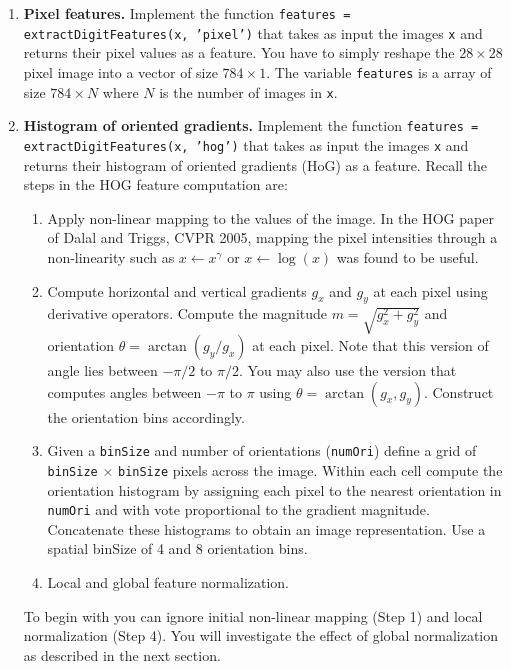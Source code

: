 \documentclass[10pt,letterpaper]{article}
\newcommand{\cmd}[1] {{\color{blue}\texttt{#1}}}
\begin{document}
\begin{enumerate}

\item \textbf{Pixel features.}  Implement the function \cmd{features = extractDigitFeatures(x, 'pixel')} that takes as input the images \cmd{x} and returns their pixel values as a feature. You have to simply reshape the $28\times28$ pixel image into a vector of size $784\times 1$. The variable \cmd{features} is a array of size $784\times N$ where $N$ is the number of images in \cmd{x}. 

\item \textbf{Histogram of oriented gradients.}
Implement the function \cmd{features = extractDigitFeatures(x, 'hog')} that takes as input the images \cmd{x} and returns their histogram of oriented gradients (HoG) as a feature. Recall the steps in the HOG feature computation are:
\begin{enumerate}

\item Apply non-linear mapping to the values of the image. In the HOG paper of Dalal and Triggs, CVPR 2005, mapping the pixel intensities through a non-linearity such as $x \leftarrow x^{\gamma}$ or $x \leftarrow \log(x)$ was found to be useful.

\item Compute horizontal and vertical gradients $g_x$ and $g_y$ at each pixel using derivative operators. Compute the magnitude $m = \sqrt{g_x^2 + g_y^2}$ and orientation $\theta=\arctan(g_y/g_x)$ at each pixel. Note that this version of angle lies between $-\pi/2$ to $\pi/2$. You may also use the version that computes angles between $-\pi$ to $\pi$ using $\theta=\arctan(g_x, g_y)$. Construct the orientation bins accordingly.
\item Given a \cmd{binSize} and number of orientations (\cmd{numOri}) define a grid of \cmd{binSize} $\times$ \cmd{binSize} pixels across the image. Within each cell compute the orientation histogram by assigning each pixel to the nearest orientation in \cmd{numOri} and with vote proportional to the gradient magnitude. Concatenate these histograms to obtain an image representation. Use a spatial binSize of 4 and 8 orientation bins.
\item Local and global feature normalization. 

\end{enumerate}

To begin with you can ignore initial non-linear mapping (Step 1) and
local normalization (Step 4). You will investigate the effect of
global normalization as described in the next section.


\end{enumerate}
\end{document}
